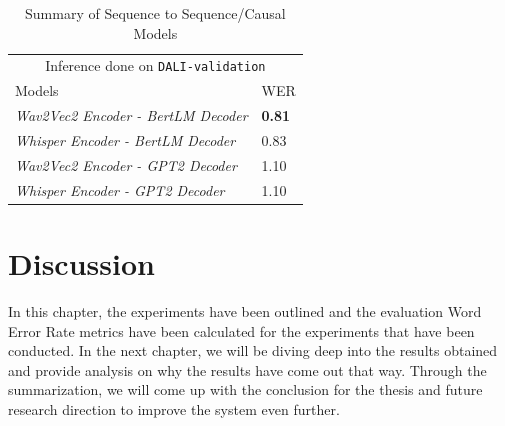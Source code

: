 \renewcommand{\arraystretch}{2}
\setlength{\arrayrulewidth}{0.3mm}
\begin{table}[H]
\small
\begin{center}
\begin{tabular}{ |p{7cm}| p{3cm}| }
\multicolumn{2}{c}{Inference done on \texttt{DALI-validation}} \\
\cline{1-2}
 Models     &  WER  \\
\hline  \hline
 \textit{Wav2Vec2 Encoder - BertLM Decoder}            &  \textbf{0.81}  \\
 \textit{Whisper Encoder - BertLM Decoder }           & 0.83 \\
 \textit{Wav2Vec2 Encoder - GPT2 Decoder }        & 1.10 \\
 \textit{Whisper Encoder - GPT2 Decoder}      & 1.10 \\
\hline  \hline
\end{tabular} 
\caption{\label{encoderdecoder} Summary of Sequence to Sequence/Causal Models}
\end{center}
\end{table}


\section{Discussion}
\label{sec:discussion-research}

In this chapter, the experiments have been outlined and the evaluation Word Error Rate metrics have been calculated for the experiments that have been conducted. In the next chapter, we will be diving deep into the results obtained and provide analysis on why the results have come out that way. Through the summarization, we will come up with the conclusion for the thesis and future research direction to improve the system even further. 
